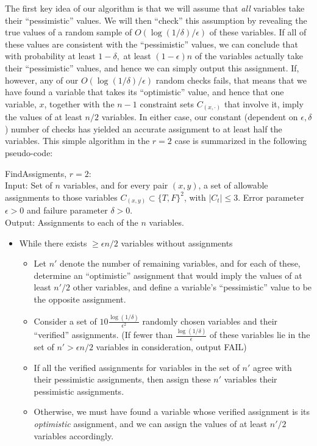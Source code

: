 \documentclass[anon,12pt]{colt2018}
\newcommand{\eps}{\epsilon}
\begin{document}
The first key idea of our algorithm is that we will assume that \emph{all} variables take their ``pessimistic'' values.   We will then ``check'' this assumption by revealing the true values of a random sample of $O(\log(1/\delta)/\eps)$ of these variables.  If all of these values are consistent with the ``pessimistic'' values, we can conclude that with probability at least $1-\delta,$ at least $(1-\eps) n$ of the variables actually take their ``pessimistic'' values, and hence we can simply output this assignment.   If, however, any of our $O(\log(1/\delta)/\eps)$ random checks fails, that means that we have found a variable that takes its ``optimistic'' value, and hence that one variable, $x$, together with the $n-1$ constraint sets $C_{(x,\cdot)}$ that involve it, imply the values of at least $n/2$ variables.  In either case, our constant (dependent on $\eps,\delta$) number of checks has yielded an accurate assignment to at least half the variables.  This simple algorithm in the $r=2$ case is summarized in the following pseudo-code:


\begin{algorithm}[H]
FindAssigments, $r=2$:\\
Input: Set of $n$ variables, and for every pair $(x,y)$, a set of allowable assignments to those variables $C_{(x,y)} \subset \{T,F\}^{2}$, with $|C_t| \le 3.$  Error parameter $\eps>0$ and failure parameter $\delta> 0$.\\
Output: Assignments to each of the $n$ variables.
\begin{itemize}
\item While there exists $\ge \eps n/2$ variables without assignments
\begin{itemize}
\item Let $n'$ denote the number of remaining variables, and for each of these, determine an ``optimistic'' assignment that would imply the values of at least $n'/2$ other variables, and define a variable's ``pessimistic'' value to be the opposite assignment. 
\item Consider a set of $10\frac{\log(1/\delta)}{\eps^2}$ randomly chosen variables and their ``verified'' assignments.  (If fewer than $\frac{\log(1/\delta)}{\eps}$ of these variables lie in the set of $n' > \eps n/2$ variables in consideration, output FAIL)
\item If all the verified assignments for variables in the set of $n'$ agree with their pessimistic assignments, then assign these $n'$ variables their pessimistic assignments.
\item Otherwise, we must have found a variable whose verified assignment is its \emph{optimistic} assignment, and we can assign the values of at least $n'/2$ variables accordingly.
\end{itemize}
\end{itemize}
\end{algorithm}
\end{document}
